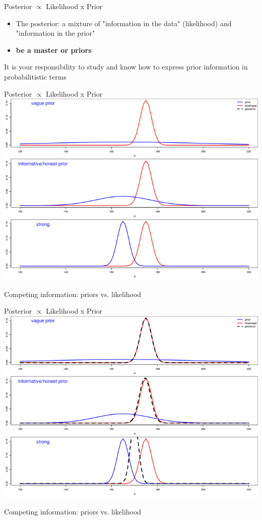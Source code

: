 \documentclass[presentation]{beamer}
\begin{document}
\begin{frame}[label=sec-19]{Posterior $\propto$ Likelihood x Prior}
\begin{itemize}
\item The posterior: a mixture of "information in the data" (likelihood) and "information in the prior"
\item \textbf{be a master or priors}
\end{itemize}
It is your responsibility to study and know how to express prior information in probabilitistic terms
\end{frame}

\begin{frame}[label=sec-20]{Posterior $\propto$ Likelihood x Prior}
\includegraphics[width=.9\linewidth]{priors1.png}

Competing information: priors vs. likelihood
\end{frame}
\begin{frame}[label=sec-21]{Posterior $\propto$ Likelihood x Prior}
\includegraphics[width=.9\linewidth]{priors2.png}

Competing information: priors vs. likelihood
\end{frame}
\end{document}
